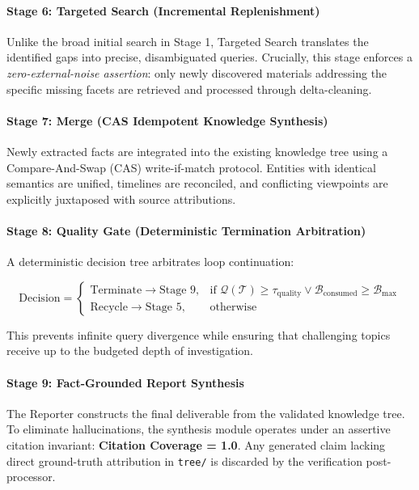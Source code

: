 \documentclass[11pt,a4paper]{article}
\begin{document}
\paragraph{Stage 6: Targeted Search (Incremental Replenishment)}
Unlike the broad initial search in Stage 1, Targeted Search translates the identified gaps into precise, disambiguated queries. Crucially, this stage enforces a \textit{zero-external-noise assertion}: only newly discovered materials addressing the specific missing facets are retrieved and processed through delta-cleaning.

\paragraph{Stage 7: Merge (CAS Idempotent Knowledge Synthesis)}
Newly extracted facts are integrated into the existing knowledge tree using a Compare-And-Swap (CAS) write-if-match protocol. Entities with identical semantics are unified, timelines are reconciled, and conflicting viewpoints are explicitly juxtaposed with source attributions.

\paragraph{Stage 8: Quality Gate (Deterministic Termination Arbitration)}
A deterministic decision tree arbitrates loop continuation:

\begin{equation}
\text{Decision} = \begin{cases} 
\text{Terminate} \rightarrow \text{Stage 9}, & \text{if } \mathcal{Q}(\mathcal{T}) \ge \tau_{\text{quality}} \lor \mathcal{B}_{\text{consumed}} \ge \mathcal{B}_{\max} \\ 
\text{Recycle} \rightarrow \text{Stage 5}, & \text{otherwise} 
\end{cases}
\end{equation}

This prevents infinite query divergence while ensuring that challenging topics receive up to the budgeted depth of investigation.

\paragraph{Stage 9: Fact-Grounded Report Synthesis}
The Reporter constructs the final deliverable from the validated knowledge tree. To eliminate hallucinations, the synthesis module operates under an assertive citation invariant: \textbf{Citation Coverage = 1.0}. Any generated claim lacking direct ground-truth attribution in \texttt{tree/} is discarded by the verification post-processor.
\end{document}
